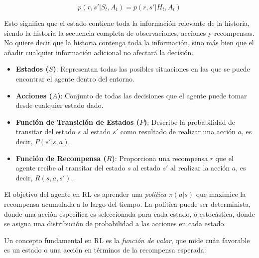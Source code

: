 \documentclass[a4paper,12pt, twoside]{report}
\begin{document}
\[
p(r, s' | S_t, A_t) = p(r, s' | H_t, A_t)
\]

Esto significa que el estado contiene toda la información relevante de la historia, siendo la historia 
la secuencia completa de observaciones, acciones y recompensas. No quiere decir que la historia contenga
toda la información, sino más bien que el añadir cualquier información adicional no afectará la decisión.

\begin{itemize}
    \item \textbf{Estados (\(S\))}: Representan todas las posibles situaciones en las que se puede 
    encontrar el agente dentro del entorno.
    \item \textbf{Acciones (\(A\))}: Conjunto de todas las decisiones que el agente puede tomar 
    desde cualquier estado dado.
    \item \textbf{Función de Transición de Estados (\(P\))}: Describe la probabilidad de transitar 
    del estado \(s\) al estado \(s'\) como resultado de realizar una acción \(a\), es decir, \(P(s'|s, a)\).
    \item \textbf{Función de Recompensa (\(R\))}: Proporciona una recompensa \(r\) que el agente 
    recibe al transitar del estado \(s\) al estado \(s'\) al realizar la acción \(a\), es decir, \(R(s, a, s')\).
\end{itemize}

El objetivo del agente en RL es aprender una \textit{política} \(\pi(a|s)\) que maximice la recompensa 
acumulada a lo largo del tiempo. La política puede ser determinista, donde una acción específica es 
seleccionada para cada estado, o estocástica, donde se asigna una distribución de probabilidad a las
acciones en cada estado.

Un concepto fundamental en RL es la \textit{función de valor}, que mide cuán favorable es un estado 
o una acción en términos de la recompensa esperada:
\end{document}
